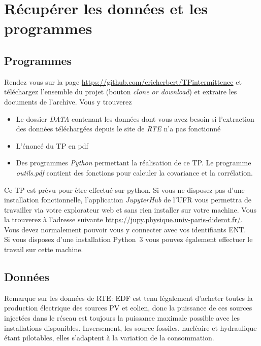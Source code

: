 \documentclass[12pt,a4,french]{article}
\newcommand{\tmtextit}[1]{{\itshape{#1}}}
\begin{document}
\section{Récupérer les données et les programmes}

\subsection{Programmes}

Rendez vous sur la page \newline
\href{https://github.com/ericherbert/TPintermittence}{https://github.com/ericherbert/TPintermittence} et téléchargez l'ensemble du projet (bouton \tmtextit{clone or download}) et extraire les
documents de l'archive. Vous y trouverez
\begin{itemize}
  \item Le dossier \tmtextit{DATA} contenant les données dont vous avez   besoin si l'extraction des données téléchargées depuis le site de   \tmtextit{RTE} n'a pas fonctionné
  
  \item L'énoncé du TP en pdf
  
  \item Des programmes \tmtextit{Python} permettant la réalisation de ce TP. Le programme \textit{outils.pdf} contient des fonctions pour calculer la covariance et la corrélation.
\end{itemize}
Ce TP est prévu pour être effectué sur python. Si vous ne disposez pas d'une installation fonctionnelle, l'application \tmtextit{JupyterHub} de l'UFR vous permettra de travailler via votre explorateur web et sans rien installer sur votre machine. Vous la trouverez à l'adresse suivante
\href{https://jupy.physique.univ-paris-diderot.fr/}{https://jupy.physique.univ-paris-diderot.fr/}. Vous devez normalement pouvoir vous y connecter avec vos identifiants ENT.\\
Si vous disposez d'une installation Python~3 vous pouvez également effectuer le travail sur cette machine.


\subsection{Données}

Remarque sur les données de RTE: EDF est tenu légalement d'acheter toutes la
production électrique des sources PV et eolien, donc la puissance de ces sources injectées dans le réseau est toujours la puissance maximale possible avec les installations disponibles. Inversement, les source fossiles, nucléaire et hydraulique étant pilotables, elles s'adaptent à la variation de la consommation.
\end{document}
